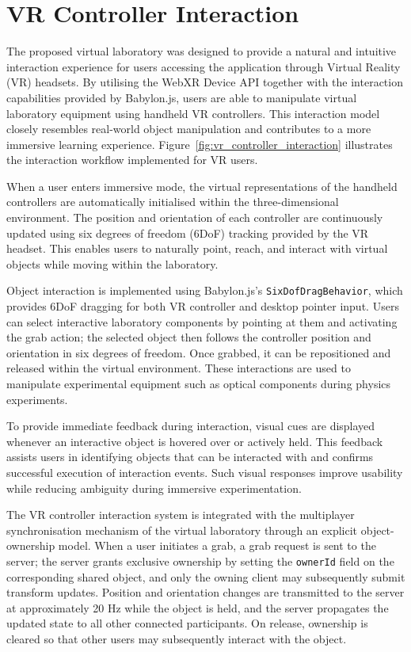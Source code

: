 \section{VR Controller Interaction}

The proposed virtual laboratory was designed to provide a natural and intuitive interaction experience for users accessing the application through Virtual Reality (VR) headsets. By utilising the WebXR Device API together with the interaction capabilities provided by Babylon.js, users are able to manipulate virtual laboratory equipment using handheld VR controllers. This interaction model closely resembles real-world object manipulation and contributes to a more immersive learning experience. Figure~\ref{fig:vr_controller_interaction} illustrates the interaction workflow implemented for VR users.

When a user enters immersive mode, the virtual representations of the handheld controllers are automatically initialised within the three-dimensional environment. The position and orientation of each controller are continuously updated using six degrees of freedom (6DoF) tracking provided by the VR headset. This enables users to naturally point, reach, and interact with virtual objects while moving within the laboratory.

Object interaction is implemented using Babylon.js's \texttt{SixDofDragBehavior}, which provides 6DoF dragging for both VR controller and desktop pointer input. Users can select interactive laboratory components by pointing at them and activating the grab action; the selected object then follows the controller position and orientation in six degrees of freedom. Once grabbed, it can be repositioned and released within the virtual environment. These interactions are used to manipulate experimental equipment such as optical components during physics experiments.

To provide immediate feedback during interaction, visual cues are displayed whenever an interactive object is hovered over or actively held. This feedback assists users in identifying objects that can be interacted with and confirms successful execution of interaction events. Such visual responses improve usability while reducing ambiguity during immersive experimentation.

The VR controller interaction system is integrated with the multiplayer synchronisation mechanism of the virtual laboratory through an explicit object-ownership model. When a user initiates a grab, a grab request is sent to the server; the server grants exclusive ownership by setting the \texttt{ownerId} field on the corresponding shared object, and only the owning client may subsequently submit transform updates. Position and orientation changes are transmitted to the server at approximately 20 Hz while the object is held, and the server propagates the updated state to all other connected participants. On release, ownership is cleared so that other users may subsequently interact with the object.

